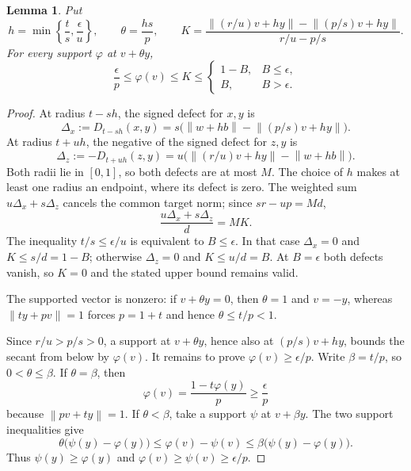 \documentclass[11pt]{article}
\newtheorem{lemma}[theorem]{Lemma}
\theoremstyle{remark}
\newcommand{\norm}[1]{\left\lVert#1\right\rVert}
\newcommand{\needroom}[1]{%
  \par\ifdim\dimexpr\pagegoal-\pagetotal\relax<#1\relax\newpage\fi}
\begin{document}
\needroom{11\baselineskip}
\begin{lemma}\label{lem:secant}
Put
\[
h=\min\left\{\frac t s,\frac\epsilon u\right\},\qquad
\theta=\frac{hs}{p},\qquad
K=\frac{\norm{(r/u)v+hy}-\norm{(p/s)v+hy}}{r/u-p/s}.
\]
For every support $\varphi$ at $v+\theta y$,
\begin{equation}\label{eq:K}
\frac\epsilon p\le\varphi(v)\le K\le
\begin{cases}
1-B,& B\le\epsilon,\\
B,& B>\epsilon.
\end{cases}
\end{equation}
\end{lemma}
\begin{proof}
At radius $t-sh$, the signed defect for $x,y$ is
\[
\Delta_x:=D_{t-sh}(x,y)=s\bigl(\norm{w+hb}-\norm{(p/s)v+hy}\bigr).
\]
At radius $t+uh$, the negative of the signed defect for $z,y$ is
\[
\Delta_z:=-D_{t+uh}(z,y)=u\bigl(\norm{(r/u)v+hy}-\norm{w+hb}\bigr).
\]
Both radii lie in $[0,1]$, so both defects are at most $M$. The choice of $h$ makes at least one radius an endpoint, where its defect is zero. The weighted sum $u\Delta_x+s\Delta_z$ cancels the common target norm; since $sr-up=Md$,
\[
\frac{u\Delta_x+s\Delta_z}{d}=MK.
\]
The inequality $t/s\le\epsilon/u$ is equivalent to $B\le\epsilon$. In that case $\Delta_x=0$ and $K\le s/d=1-B$; otherwise $\Delta_z=0$ and $K\le u/d=B$. At $B=\epsilon$ both defects vanish, so $K=0$ and the stated upper bound remains valid.

The supported vector is nonzero: if $v+\theta y=0$, then $\theta=1$ and $v=-y$, whereas $\norm{ty+pv}=1$ forces $p=1+t$ and hence $\theta\le t/p<1$.

Since $r/u>p/s>0$, a support at $v+\theta y$, hence also at $(p/s)v+hy$, bounds the secant from below by $\varphi(v)$. It remains to prove $\varphi(v)\ge\epsilon/p$. Write $\beta=t/p$, so $0<\theta\le\beta$. If $\theta=\beta$, then
\[
\varphi(v)=\frac{1-t\varphi(y)}p\ge\frac\epsilon p
\]
because $\norm{pv+ty}=1$. If $\theta<\beta$, take a support $\psi$ at $v+\beta y$. The two support inequalities give
\[
\theta\bigl(\psi(y)-\varphi(y)\bigr)
\le\varphi(v)-\psi(v)
\le\beta\bigl(\psi(y)-\varphi(y)\bigr).
\]
Thus $\psi(y)\ge\varphi(y)$ and $\varphi(v)\ge\psi(v)\ge\epsilon/p$.
\end{proof}
\end{document}
